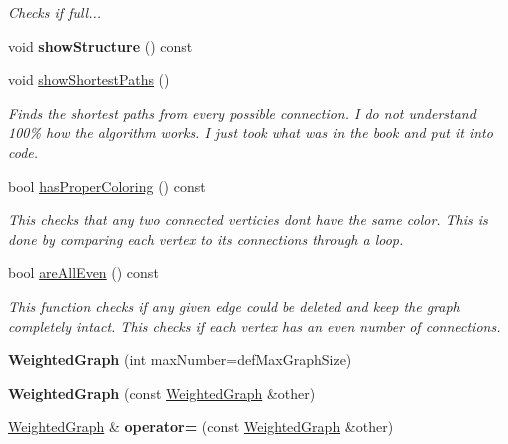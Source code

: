 \begin{DoxyCompactItemize}
\begin{DoxyCompactList}\small\item\em Checks if full... \end{DoxyCompactList}\item 
\hypertarget{class_weighted_graph_ad7f20a989073ea5401d504d944182347}{void {\bfseries show\+Structure} () const }\label{class_weighted_graph_ad7f20a989073ea5401d504d944182347}

\item 
void \hyperlink{class_weighted_graph_a8e6ea9adc87345052786eec67a5f9164}{show\+Shortest\+Paths} ()
\begin{DoxyCompactList}\small\item\em Finds the shortest paths from every possible connection. I do not understand 100\% how the algorithm works. I just took what was in the book and put it into code. \end{DoxyCompactList}\item 
bool \hyperlink{class_weighted_graph_a60be8bab10a9142846093cb768855efd}{has\+Proper\+Coloring} () const 
\begin{DoxyCompactList}\small\item\em This checks that any two connected verticies dont have the same color. This is done by comparing each vertex to its connections through a loop. \end{DoxyCompactList}\item 
bool \hyperlink{class_weighted_graph_a03884e32b9e093b10e3a44add7eaa928}{are\+All\+Even} () const 
\begin{DoxyCompactList}\small\item\em This function checks if any given edge could be deleted and keep the graph completely intact. This checks if each vertex has an even number of connections. \end{DoxyCompactList}\item 
\hypertarget{class_weighted_graph_acf8f5b4f212bc8daf4b12f0b88899180}{{\bfseries Weighted\+Graph} (int max\+Number=def\+Max\+Graph\+Size)}\label{class_weighted_graph_acf8f5b4f212bc8daf4b12f0b88899180}

\item 
\hypertarget{class_weighted_graph_a294fd717db213e761dc0eb65bbfcb7ab}{{\bfseries Weighted\+Graph} (const \hyperlink{class_weighted_graph}{Weighted\+Graph} \&other)}\label{class_weighted_graph_a294fd717db213e761dc0eb65bbfcb7ab}

\item 
\hypertarget{class_weighted_graph_a32c3057c0f746f427068be4a9b408845}{\hyperlink{class_weighted_graph}{Weighted\+Graph} \& {\bfseries operator=} (const \hyperlink{class_weighted_graph}{Weighted\+Graph} \&other)}\label{class_weighted_graph_a32c3057c0f746f427068be4a9b408845}


\end{DoxyCompactItemize}
